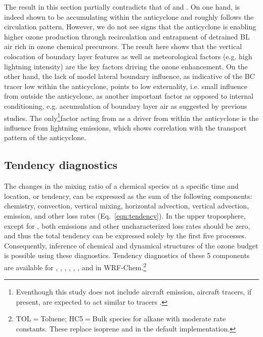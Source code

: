 The result in this section partially contradicts that of \citet{Li:2005ss} and \citet{Cooper:2007cr}. On one hand, {\lnox} is indeed shown to be
accumulating within the anticyclone and roughly follows the circulation pattern. However, we do not see signs that the anticyclone is
enabling higher ozone production through recirculation and entrapment of detrained BL air rich in ozone chemical precursors. The result here
shows that the vertical colocation of boundary layer features as well as meteorological factors (e.g. high lightning intensity) are the key factors
driving the ozone enhancement. On the other hand, the lack of model lateral boundary influence, as indicative of the BC tracer low within the
anticyclone, points to low externality, i.e. small influence from outside the anticyclone, as another important factor as opposed to internal conditioning,
e.g. accumulation of boundary layer air as suggested by previous studies. The only\footnote{Eventhough this study does not include aircraft emission,
aircraft tracers, if present, are expected to act similar to {\lnox} tracers \citep[see][]{Hudman:2007fu}.}factor acting from as a driver from within
the anticyclone is the influence from lightning emissions, which shows correlation with the transport pattern of the anticyclone.

\subsection{Tendency diagnostics}\label{ssec:2006/discuss/tendency}

The changes in the mixing ratio of a chemical species at a specific time and location, or tendency, can be expressed as
the sum of the following components: chemistry, convection, vertical mixing, horizontal advection, vertical advection, emission,
and other loss rates (Eq.~\ref{eqn:tendency}). In the upper troposphere, except for , both emissions and other
uncharacterized loss rates should be zero, and thus the total tendency can be expressed solely by the first five processes.
Consequently, inference of chemical and dynamical structures of the ozone budget is possible using these diagnostics.
Tendency diagnostics of these 5 components are available for , , , , 
, , and  in WRF-Chem.\footnote{TOL$=$Toluene; HC5$=$Bulk species for alkane with moderate 
rate constants. These replace isoprene and  in the default implementation.}

